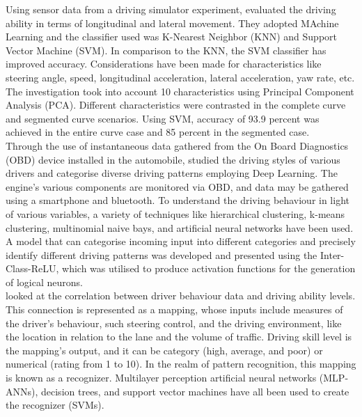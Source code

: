 \documentclass[12pt,letterpaper]{report}
\begin{document}
Using sensor data from a driving simulator experiment, \textbf{\cite{chandrasiri2012driving}} evaluated the driving ability in terms of longitudinal and lateral movement. They adopted MAchine Learning and the classifier used was K-Nearest Neighbor (KNN) and Support Vector Machine (SVM). In comparison to the KNN, the SVM classifier has improved accuracy. Considerations have been made for characteristics like steering angle, speed, longitudinal acceleration, lateral acceleration, yaw rate, etc. The investigation took into account 10 characteristics using Principal Component Analysis (PCA). Different characteristics were contrasted in the complete curve and segmented curve scenarios. Using SVM, accuracy of 93.9 percent was achieved in the entire curve case and 85 percent in the segmented case.\\

Through the use of instantaneous data gathered from the On Board Diagnostics (OBD) device installed in the automobile, \textbf{\cite{malik2021driving}}  studied the driving styles of various drivers and categorise diverse driving patterns employing Deep Learning. The engine's various components are monitored via OBD, and data may be gathered using a smartphone and bluetooth. To understand the driving behaviour in light of various variables, a variety of techniques like hierarchical clustering, k-means clustering, multinomial naive bays, and artificial neural networks have been used. A model that can categorise incoming input into different categories and precisely identify different driving patterns was developed and presented using the Inter-Class-ReLU, which was utilised to produce activation functions for the generation of logical neurons.\\ 

\textbf{\cite{zhang2010pattern}} looked at the correlation between driver behaviour data and driving ability levels. This connection is represented as a mapping, whose inputs include measures of the driver's behaviour, such steering control, and the driving environment, like the location in relation to the lane and the volume of traffic. Driving skill level is the mapping's output, and it can be category (high, average, and poor) or numerical (rating from 1 to 10). In the realm of pattern recognition, this mapping is known as a recognizer. Multilayer perception artificial neural networks (MLP-ANNs), decision trees, and support vector machines have all been used to create the recognizer (SVMs).\\
\end{document}
